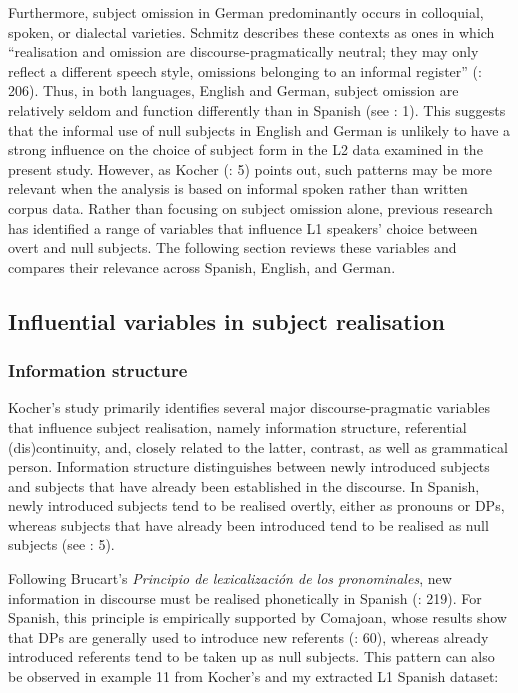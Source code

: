 \documentclass[
  letterpaper,
  DIV=11,
  numbers=noendperiod]{scrartcl}
\begin{document}
Furthermore, subject omission in German predominantly occurs in
colloquial, spoken, or dialectal varieties. Schmitz describes these
contexts as ones in which ``realisation and omission are
discourse-pragmatically neutral; they may only reflect a different
speech style, omissions belonging to an informal register''
(: 206).
Thus, in both languages, English and German, subject omission are
relatively seldom and function differently than in Spanish (see
: 1). This
suggests that the informal use of null subjects in English and German is
unlikely to have a strong influence on the choice of subject form in the
L2 data examined in the present study. However, as Kocher
(: 5) points out, such patterns
may be more relevant when the analysis is based on informal spoken
rather than written corpus data. Rather than focusing on subject
omission alone, previous research has identified a range of variables
that influence L1 speakers' choice between overt and null subjects. The
following section reviews these variables and compares their relevance
across Spanish, English, and German.

\subsection{Influential variables in subject
realisation}\label{sec-influential-factors}

\subsubsection{Information structure}\label{sec-InformationStructure}

Kocher's study primarily identifies several major discourse-pragmatic
variables that influence subject realisation, namely information
structure, referential (dis)continuity, and, closely related to the
latter, contrast, as well as grammatical person. Information structure
distinguishes between newly introduced subjects and subjects that have
already been established in the discourse. In Spanish, newly introduced
subjects tend to be realised overtly, either as pronouns or DPs, whereas
subjects that have already been introduced tend to be realised as null
subjects (see : 5).

Following Brucart's \emph{Principio de lexicalización de los
pronominales}, new information in discourse must be realised
phonetically in Spanish (:
219). For Spanish, this principle is empirically supported by Comajoan,
whose results show that DPs are generally used to introduce new
referents (: 60), whereas
already introduced referents tend to be taken up as null subjects. This
pattern can also be observed in example 11 from Kocher's and my
extracted L1 Spanish dataset:
\end{document}
